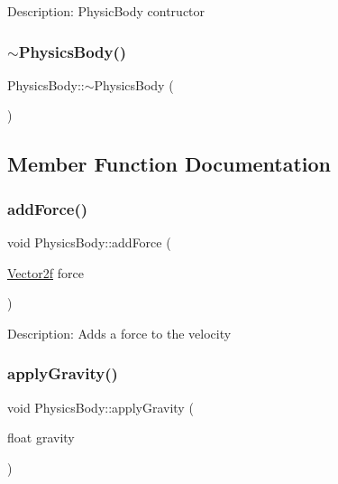 Description\+: Physic\+Body contructor \mbox{\label{class_physics_body_a4d09ec1845ec536f78d1c2f2fa9d789f}} 
\subsubsection{\texorpdfstring{$\sim$PhysicsBody()}{~PhysicsBody()}}
{\footnotesize\ttfamily Physics\+Body\+::$\sim$\+Physics\+Body (\begin{DoxyParamCaption}{ }\end{DoxyParamCaption})}



\subsection{Member Function Documentation}
\mbox{\label{class_physics_body_a920691097ccaf25b2dea6a4fb53d9921}} 
\subsubsection{\texorpdfstring{addForce()}{addForce()}}
{\footnotesize\ttfamily void Physics\+Body\+::add\+Force (\begin{DoxyParamCaption}\item[{\mbox{\hyperlink{class_vector2f}{Vector2f}}}]{force }\end{DoxyParamCaption})}

Description\+: Adds a force to the velocity \mbox{\label{class_physics_body_a7a513590168e6409fe9bee61f21b6689}} 
\subsubsection{\texorpdfstring{applyGravity()}{applyGravity()}}
{\footnotesize\ttfamily void Physics\+Body\+::apply\+Gravity (\begin{DoxyParamCaption}\item[{float}]{gravity }\end{DoxyParamCaption})}

